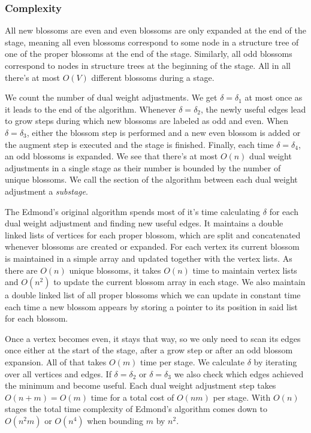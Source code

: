 \subsubsection{Complexity}

All new blossoms are even and even blossoms are only expanded at the end of the stage, meaning all even blossoms correspond to some node in a structure tree of one of the proper blossoms at the end of the stage. Similarly, all odd blossoms correspond to nodes in structure trees at the beginning of the stage. All in all there's at most $O(V)$ different blossoms during a stage. 

We count the number of dual weight adjustments. We get $\delta = \delta_1$ at most once as it leads to the end of the algorithm. Whenever $\delta = \delta_2$, the newly useful edges lead to grow steps during which new blossoms are labeled as odd and even. When $\delta = \delta_3$, either the blossom step is performed and a new even blossom is added or the augment step is executed and the stage is finished. Finally, each time $\delta = \delta_4$, an odd blossoms is expanded. We see that there's at most $O(n)$ dual weight adjustments in a single stage as their number is bounded by the number of unique blossoms. We call the section of the algorithm between each dual weight adjustment a \textit{substage}.

The Edmond's original algorithm spends most of it's time calculating $\delta$ for each dual weight adjustment and finding new useful edges. It maintains a double linked lists of vertices for each proper blossom, which are split and concatenated whenever blossoms are created or expanded. For each vertex its current blossom is maintained in a simple array and updated together with the vertex lists. As there are $O(n)$ unique blossoms, it takes $O(n)$ time to maintain vertex lists and $O(n^2)$ to update the current blossom array in each stage. We also maintain a double linked list of all proper blossoms which we can update in constant time each time a new blossom appears by storing a pointer to its position in said list for each blossom.

Once a vertex becomes even, it stays that way, so we only need to scan its edges once either at the start of the stage, after a grow step or after an odd blossom expansion. All of that takes $O(m)$ time per stage. We calculate $\delta$ by iterating over all vertices and edges. If $\delta = \delta_2$ or $\delta = \delta_3$ we also check which edges achieved the minimum and become useful. Each dual weight adjustment step takes $O(n+m)=O(m)$ time for a total cost of $O(nm)$ per stage. With $O(n)$ stages the total time complexity of Edmond's algorithm comes down to $O(n^2m)$ or $O(n^4)$ when bounding $m$ by $n^2$.

